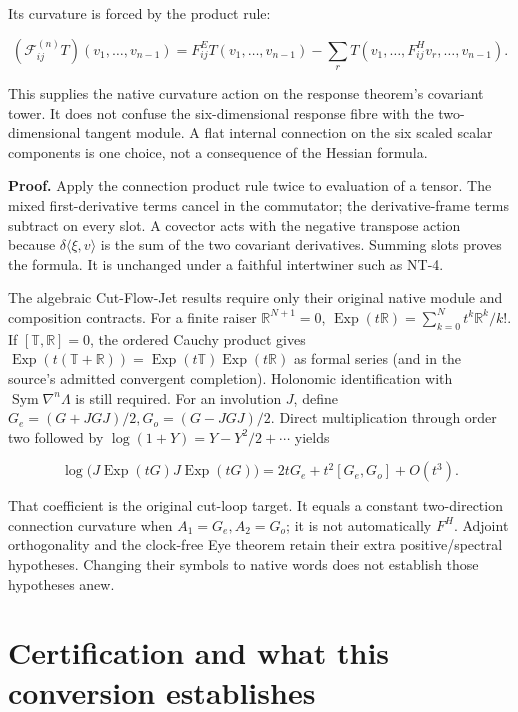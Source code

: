 \documentclass[
  11pt,
]{article}
\begin{document}
Its curvature is forced by the product rule:

\[
(\mathcal F^{(n)}_{ij}T)(v_1,\ldots,v_{n-1})
=F^E_{ij}T(v_1,\ldots,v_{n-1})
-\sum_r T(v_1,\ldots,F^H_{ij}v_r,\ldots,v_{n-1}).
\]

This supplies the native curvature action on the response theorem's
covariant tower. It does not confuse the six-dimensional response fibre
with the two-dimensional tangent module. A flat internal connection on
the six scaled scalar components is one choice, not a consequence of the
Hessian formula.

\textbf{Proof.} Apply the connection product rule twice to evaluation of
a tensor. The mixed first-derivative terms cancel in the commutator; the
derivative-frame terms subtract on every slot. A covector acts with the
negative transpose action because \(\delta\langle\xi,v\rangle\) is the
sum of the two covariant derivatives. Summing slots proves the formula.
It is unchanged under a faithful intertwiner such as NT-4.

The algebraic Cut-Flow-Jet results require only their original native
module and composition contracts. For a finite raiser
\(\mathbb R^{N+1}=0\),
\(\operatorname{Exp}(t\mathbb R)=\sum_{k=0}^Nt^k\mathbb R^k/k!\). If
\([\mathbb T,\mathbb R]=0\), the ordered Cauchy product gives
\(\operatorname{Exp}(t(\mathbb T+\mathbb R)) =\operatorname{Exp}(t\mathbb T)\operatorname{Exp}(t\mathbb R)\)
as formal series (and in the source's admitted convergent completion).
Holonomic identification with \(\operatorname{Sym}\nabla^n\Lambda\) is
still required. For an involution \(J\), define
\(G_e=(G+JGJ)/2,G_o=(G-JGJ)/2\). Direct multiplication through order two
followed by \(\log(1+Y)=Y-Y^2/2+\cdots\) yields

\[
\log\bigl(J\operatorname{Exp}(tG)J\operatorname{Exp}(tG)\bigr)
=2tG_e+t^2[G_e,G_o]+O(t^3).
\]

That coefficient is the original cut-loop target. It equals a constant
two-direction connection curvature when \(A_1=G_e,A_2=G_o\); it is not
automatically \(F^H\). Adjoint orthogonality and the clock-free Eye
theorem retain their extra positive/spectral hypotheses. Changing their
symbols to native words does not establish those hypotheses anew.

\hypertarget{certification-and-what-this-conversion-establishes}{%
\section{Certification and what this conversion
establishes}\label{certification-and-what-this-conversion-establishes}}
\end{document}
